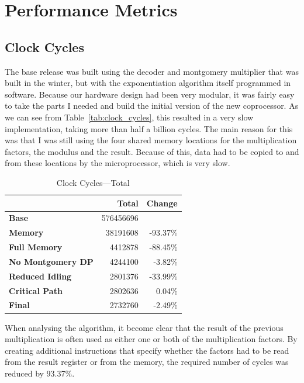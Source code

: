 \documentclass[a4paper]{article}
\begin{document}
\section{Performance Metrics}

\subsection{Clock Cycles}

The base release was built using the decoder and montgomery multiplier that was built in the winter, but with the exponentiation algorithm itself programmed in software. Because our hardware design had been very modular, it was fairly easy to take the parts I needed and build the initial version of the new coprocessor. As we can see from Table~\ref{tab:clock_cycles}, this resulted in a very slow implementation, taking more than half a billion cycles. The main reason for this was that I was still using the four shared memory locations for the multiplication factors, the modulus and the result. Because of this, data had to be copied to and from these locations by the microprocessor, which is very slow.\\

\begin{table}[H]
    \begin{center}	
        \begin{tabular}{l|r|r}
            & \textbf{Total} & \textbf{Change}\\\hline
            \textbf{Base} & 576456696 & \\
            \textbf{Memory} & 38191608 & -93.37\%\\
            \textbf{Full Memory} & 4412878 & -88.45\%\\
            \textbf{No Montgomery DP} & 4244100 & -3.82\%\\
            \textbf{Reduced Idling} & 2801376 & -33.99\%\\
            \textbf{Critical Path} & 2802636 & 0.04\%\\
            \textbf{Final} & 2732760 & -2.49\%
		\end{tabular}
	\end{center}
	\caption{Clock Cycles---Total}
	\label{tab:clock_cycles_total}
\end{table}

When analysing the algorithm, it become clear that the result of the previous multiplication is often used as either one or both of the multiplication factors. By creating additional instructions that specify whether the factors had to be read from the result register or from the memory, the required number of cycles was reduced by 93.37\%.\\
\end{document}
